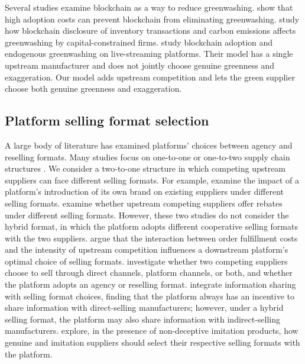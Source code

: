 \documentclass[preprint,review,12pt,authoryear,nopreprintline]{elsarticle}
\theoremstyle{definition}
\begin{document}
Several studies examine blockchain as a way to reduce greenwashing. \citet{dong2023log} show that high adoption costs can prevent blockchain from eliminating greenwashing. \citet{xia2026bl} study how blockchain disclosure of inventory transactions and carbon emissions affects greenwashing by capital-constrained firms. \citet{xu2025should} study blockchain adoption and endogenous greenwashing on live-streaming platforms. Their model has a single upstream manufacturer and does not jointly choose genuine greenness and exaggeration. Our model adds upstream competition and lets the green supplier choose both genuine greenness and exaggeration.

\subsection{Platform selling format selection}\label{sec:2.2}

A large body of literature has examined platforms' choices between agency and reselling formats. Many studies focus on one-to-one or one-to-two supply chain structures \citep{Abhishek2016, ha2022channel, zha2023, Hsiao2024}. We consider a two-to-one structure in which competing upstream suppliers can face different selling formats. For example, \citet{cheng2023impact} examine the impact of a platform's introduction of its own brand on existing suppliers under different selling formats. \citet{jiang2024selling} examine whether upstream competing suppliers offer rebates under different selling formats. However, these two studies do not consider the hybrid format, in which the platform adopts different cooperative selling formats with the two suppliers. \citet{tian2018mark} argue that the interaction between order fulfillment costs and the intensity of upstream competition influences a downstream platform's optimal choice of selling formats. \citet{Matsui2024} investigate whether two competing suppliers choose to sell through direct channels, platform channels, or both, and whether the platform adopts an agency or reselling format. \citet{li2024selling} integrate information sharing with selling format choices, finding that the platform always has an incentive to share information with direct-selling manufacturers; however, under a hybrid selling format, the platform may also share information with indirect-selling manufacturers. \citet{yuan2025re} explore, in the presence of non-deceptive imitation products, how genuine and imitation suppliers should select their respective selling formats with the platform.
\end{document}
